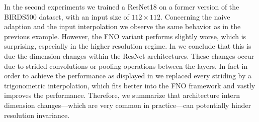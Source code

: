 In the second experiments we trained a ResNet18 \cite{he2016deep} on a former version of the BIRDS500 dataset, with an input size of $112\times 112$. Concerning the naive adaption and the input interpolation we observe the same behavior as in the previous example. However, the FNO variant performs slightly worse, which is surprising, especially in the higher resolution regime. In \cite{kabri2023resolution} we conclude that this is due the dimension changes within the ResNet architectures. These changes occur due to strided convolutions or pooling operations between the layers. In fact in order to achieve the performance as displayed in \cite[Fig. 4 (b)]{kabri2023resolution} we replaced every striding by a trigonometric interpolation, which fits better into the FNO framework and vastly improves the performance. Therefore, we summarize that architecture intern dimension changes---which are very common in practice---can potentially hinder resolution invariance.